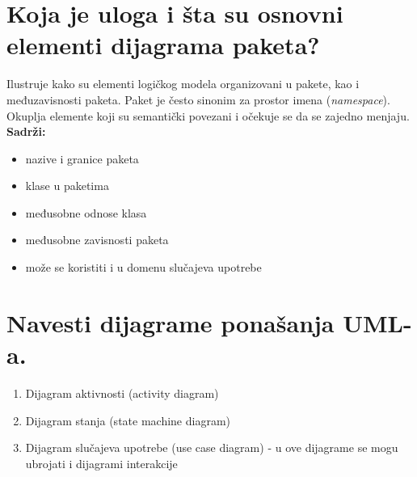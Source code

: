 \documentclass[a4paper]{article}
\begin{document}
\section{Koja je uloga i šta su osnovni elementi dijagrama paketa?}
  Ilustruje kako su elementi logičkog modela organizovani u pakete, kao i međuzavisnosti paketa. 
  Paket je često sinonim za prostor imena (\textit{namespace}). Okuplja elemente koji su semantički 
  povezani i očekuje se da se zajedno menjaju. \\
  \textbf{Sadrži:}
  \begin{itemize}
    \item nazive i granice paketa
    \item klase u paketima
    \item međusobne odnose klasa
    \item međusobne zavisnosti paketa
    \item može se koristiti i u domenu slučajeva upotrebe
  \end{itemize}

\section{Navesti dijagrame ponašanja UML-a.}
  \begin{enumerate}
    \item Dijagram aktivnosti (activity diagram)
    \item Dijagram stanja (state machine diagram)
    \item Dijagram slučajeva upotrebe (use case diagram) 
          - u ove dijagrame se mogu ubrojati i dijagrami interakcije
  \end{enumerate}
\end{document}

